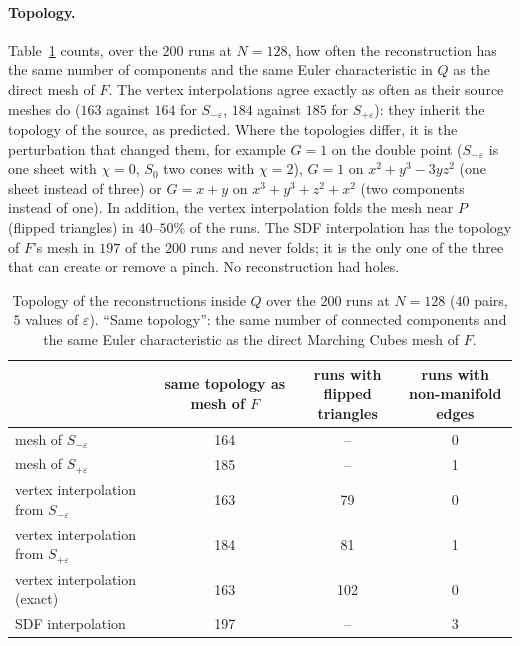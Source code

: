 \documentclass[12pt, a4paper]{article}
\theoremstyle{plain}
\theoremstyle{definition}
\theoremstyle{remark}
\theoremstyle{definition}
\begin{document}
\paragraph{Topology.} Table~\ref{tab:interp-topology} counts, over the $200$ runs at
$N=128$, how often the reconstruction has the same number of components and the
same Euler characteristic in $Q$ as the direct mesh of $F$. The vertex
interpolations agree exactly as often as their source meshes do ($163$ against
$164$ for $S_{-\varepsilon}$, $184$ against $185$ for $S_{+\varepsilon}$): they
inherit the topology of the source, as predicted. Where the topologies differ, it
is the perturbation that changed them, for example $G=1$ on the double point
($S_{-\varepsilon}$ is one sheet with $\chi=0$, $S_0$ two cones with $\chi=2$),
$G=1$ on $x^2+y^3-3yz^2$ (one sheet instead of three) or $G=x+y$ on
$x^3+y^3+z^2+x^2$ (two components instead of one). In addition, the vertex
interpolation folds the mesh near $P$ (flipped triangles) in $40$--$50\%$ of the
runs. The SDF interpolation has the topology of $F$'s mesh in $197$ of the $200$
runs and never folds; it is the only one of the three that can create or remove a
pinch. No reconstruction had holes.

\begin{table}[!ht]
\centering
\small
\begin{tabular}{l c c c}
\toprule
& \makecell{same topology\\as mesh of $F$}
& \makecell{runs with\\flipped triangles}
& \makecell{runs with\\non-manifold edges} \\
\midrule
mesh of $S_{-\varepsilon}$ & 164 & -- & 0 \\
mesh of $S_{+\varepsilon}$ & 185 & -- & 1 \\
vertex interpolation from $S_{-\varepsilon}$ & 163 & 79 & 0 \\
vertex interpolation from $S_{+\varepsilon}$ & 184 & 81 & 1 \\
vertex interpolation (exact) & 163 & 102 & 0 \\
SDF interpolation & 197 & -- & 3 \\
\bottomrule
\end{tabular}
\caption[Interpolation: topology]{Topology of the reconstructions inside $Q$ over the $200$ runs at $N=128$ ($40$ pairs, $5$ values of $\varepsilon$). ``Same topology'': the same number of connected components and the same Euler characteristic as the direct Marching Cubes mesh of $F$.}
\label{tab:interp-topology}
\end{table}
\end{document}
